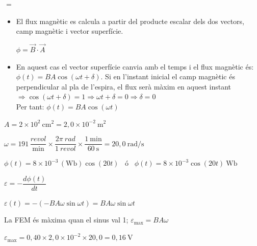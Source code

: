 \begin{solapartat}
 $=$
\begin{itemize}[label={}, leftmargin=2em]
\item El flux magnètic es calcula a partir del producte escalar dels dos vectors, camp magnètic i vector superfície.

$\phi = \vec{B}\cdot\vec{A}$ 

\item En aquest cas el vector superfície canvia amb el temps i el flux magnètic és: $\phi(t) = BA\cos(\omega t + \delta)$. Si en l'instant inicial el camp magnètic és perpendicular al pla de l'espira, el flux serà màxim en aquest instant $\Rightarrow \cos(\omega t + \delta) = 1 \Rightarrow \omega t + \delta = 0 \Rightarrow \delta = 0$ \\
Per tant: $\phi(t) = BA\cos(\omega t)$ 
\end{itemize}

 $A = 2\times 10^{2}\ \mathrm{cm^2} = 2,0\times 10^{-2}\ \mathrm{m^2}$

 $\omega = 191\,\dfrac{\mathit{revol}}{\mathrm{min}}\times\dfrac{2\pi\ \mathit{rad}}{1\ \mathit{revol}}\times\dfrac{1\ \mathrm{min}}{60\ \mathrm{s}} = 20,0\ \mathrm{rad/s}$

 $\phi(t) = 8\times 10^{-3}\,(\mathrm{Wb})\cos(20t)$ \ ó \ $\phi(t) = 8\times 10^{-3}\cos(20t)\ \mathrm{Wb}$
\end{solapartat}

\begin{solapartat}
 $\varepsilon = -\dfrac{d\phi(t)}{dt}$

 $\varepsilon(t) = -(-BA\omega\sin\omega t) = BA\omega\sin\omega t$

 La FEM és màxima quan el sinus val 1; $\varepsilon_\mathrm{max} = BA\omega$

 $\varepsilon_\mathrm{max} = 0,40\times 2,0\times 10^{-2}\times 20,0 = 0,16\ \mathrm{V}$
\end{solapartat}
